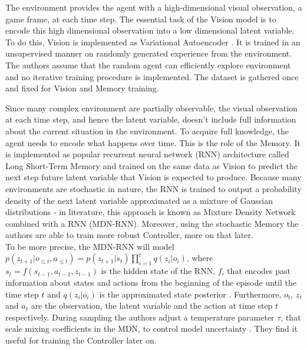The environment provides the agent with a high-dimensional visual observation, a game frame, at each time step. The essential task of the Vision model is to encode this high dimensional observation into a low dimensional latent variable. To do this, Vision is implemented as Variational Autoencoder \cite{Algo.VAE}. It is trained in an unsupervised manner on randomly generated experience from the environment. The authors assume that the random agent can efficiently explore environment and no iterative training procedure is implemented. The dataset is gathered once and fixed for Vision and Memory training.

Since many complex environment are partially observable, the visual observation at each time step, and hence the latent variable, doesn't include full information about the current situation in the environment. To acquire full knowledge, the agent needs to encode what happens over time. This is the role of the Memory. It is implemented as popular recurrent neural network (RNN) architecture called Long Short-Term Memory \cite{Algo.LSTM} and trained on the same data as Vision to predict the next step future latent variable that Vision is expected to produce. Because many environments are stochastic in nature, the RNN is trained to output a probability density of the next latent variable approximated as a mixture of Gaussian distributions - in literature, this approach is known as Mixture Density Network combined with a RNN \cite{Algo.MDNRNN} (MDN-RNN). Moreover, using the stochastic Memory the authors are able to train more robust Controller, more on that later. \\
To be more precise, the MDN-RNN will model $p(z_{t+1} | o_{\leqslant t}, a_{\leqslant t}) = p(z_{t+1} | s_t) \prod_{i=1}^t q(z_i | o_i)$, where $s_t = f(s_{t-1}, a_{t-1}, z_{t-1})$ is the hidden state of the RNN, $f$, that encodes past information about states and actions from the beginning of the episode until the time step $t$ and $q(z_i | o_i)$ is the approximated state posterior \cite{Algo.VAE}. Furthermore, $o_{t}$, $z_{t}$ and $a_{t}$ are the observation, the latent variable and the action at time step $t$ respectively. During sampling the authors adjust a temperature parameter $\tau$, that scale mixing coefficients in the MDN, to control model uncertainty \cite{Algo.Sketch-RNN}. They find it useful for training the Controller later on.


